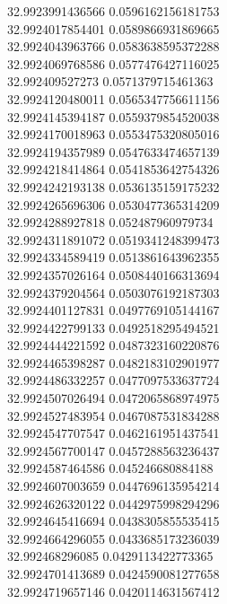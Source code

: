 {32.9923991436566	0.0596162156181753\\
32.9924017854401	0.0589866931869665\\
32.9924043963766	0.0583638595372288\\
32.9924069768586	0.0577476427116025\\
32.992409527273	0.0571379715461363\\
32.9924120480011	0.0565347756611156\\
32.9924145394187	0.0559379854520038\\
32.9924170018963	0.0553475320805016\\
32.9924194357989	0.0547633474657139\\
32.9924218414864	0.0541853642754326\\
32.9924242193138	0.0536135159175232\\
32.9924265696306	0.0530477365314209\\
32.9924288927818	0.052487960979734\\
32.9924311891072	0.0519341248399473\\
32.9924334589419	0.0513861643962355\\
32.9924357026164	0.0508440166313694\\
32.9924379204564	0.0503076192187303\\
32.9924401127831	0.0497769105144167\\
32.9924422799133	0.0492518295494521\\
32.9924444221592	0.0487323160220876\\
32.9924465398287	0.0482183102901977\\
32.9924486332257	0.0477097533637724\\
32.9924507026494	0.0472065868974975\\
32.9924527483954	0.0467087531834288\\
32.9924547707547	0.0462161951437541\\
32.9924567700147	0.0457288563236437\\
32.9924587464586	0.045246680884188\\
32.9924607003659	0.0447696135954214\\
32.9924626320122	0.0442975998294296\\
32.9924645416694	0.0438305855535415\\
32.9924664296055	0.0433685173236039\\
32.992468296085	0.0429113422773365\\
32.9924701413689	0.0424590081277658\\
32.9924719657146	0.0420114631567412\\
}
